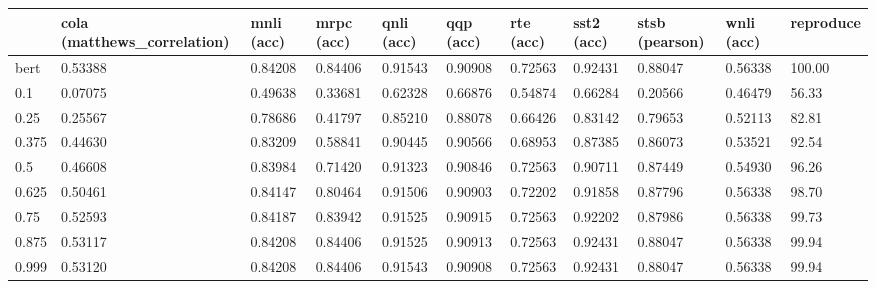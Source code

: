 \begin{tabular}{lllllllllll}
\toprule
{} & cola (matthews\_correlation) & mnli (acc) & mrpc (acc) & qnli (acc) & qqp (acc) & rte (acc) & sst2 (acc) & stsb (pearson) & wnli (acc) & reproduce \\
\midrule
bert  &                     0.53388 &    0.84208 &    0.84406 &    0.91543 &   0.90908 &   0.72563 &    0.92431 &        0.88047 &    0.56338 &    100.00 \\
0.1   &                     0.07075 &    0.49638 &    0.33681 &    0.62328 &   0.66876 &   0.54874 &    0.66284 &        0.20566 &    0.46479 &     56.33 \\
0.25  &                     0.25567 &    0.78686 &    0.41797 &    0.85210 &   0.88078 &   0.66426 &    0.83142 &        0.79653 &    0.52113 &     82.81 \\
0.375 &                     0.44630 &    0.83209 &    0.58841 &    0.90445 &   0.90566 &   0.68953 &    0.87385 &        0.86073 &    0.53521 &     92.54 \\
0.5   &                     0.46608 &    0.83984 &    0.71420 &    0.91323 &   0.90846 &   0.72563 &    0.90711 &        0.87449 &    0.54930 &     96.26 \\
0.625 &                     0.50461 &    0.84147 &    0.80464 &    0.91506 &   0.90903 &   0.72202 &    0.91858 &        0.87796 &    0.56338 &     98.70 \\
0.75  &                     0.52593 &    0.84187 &    0.83942 &    0.91525 &   0.90915 &   0.72563 &    0.92202 &        0.87986 &    0.56338 &     99.73 \\
0.875 &                     0.53117 &    0.84208 &    0.84406 &    0.91525 &   0.90913 &   0.72563 &    0.92431 &        0.88047 &    0.56338 &     99.94 \\
0.999 &                     0.53120 &    0.84208 &    0.84406 &    0.91543 &   0.90908 &   0.72563 &    0.92431 &        0.88047 &    0.56338 &     99.94 \\
\bottomrule
\end{tabular}
